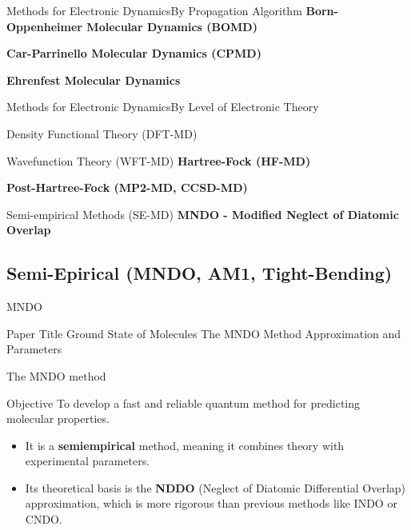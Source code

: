 \begin{frame}{Methods for Electronic Dynamics}{By Propagation Algorithm}
    \textbf{Born-Oppenheimer Molecular Dynamics (BOMD)}
    \vspace{1em}
    
    \textbf{Car-Parrinello Molecular Dynamics (CPMD)}
    \vspace{1em}
    
    \textbf{Ehrenfest Molecular Dynamics}
\end{frame}

\begin{frame}{Methods for Electronic Dynamics}{By Level of Electronic Theory}
    \begin{block}{Density Functional Theory (DFT-MD)}
    \end{block}
    
    \begin{block}{Wavefunction Theory (WFT-MD)}
        \textbf{Hartree-Fock (HF-MD)}
        \vspace{0.5em}
        
        \textbf{Post-Hartree-Fock (MP2-MD, CCSD-MD)}
    \end{block}
    
    \begin{block}{Semi-empirical Methods (SE-MD)}
    	\textbf{MNDO - Modified Neglect of Diatomic Overlap}
    \end{block}
\end{frame}

\subsection{Semi-Epirical (MNDO, AM1, Tight-Bending)}


\begin{frame}{MNDO}
	\begin{block}{Paper Title}
	Ground State of Molecules The MNDO Method Approximation and Parameters
	\end{block}
\end{frame}

\begin{frame}{The MNDO method}
    \begin{block}{Objective}
        To develop a fast and reliable quantum method for predicting molecular properties.
    \end{block}
    \pause
    
    \begin{itemize}
        \item It is a \textbf{semiempirical} method, meaning it combines theory with experimental parameters.
        \pause
        \bigskip
        \item Its theoretical basis is the \textbf{NDDO} (Neglect of Diatomic Differential Overlap) approximation, which is more rigorous than previous methods like INDO or CNDO.
    \end{itemize}
\end{frame}



